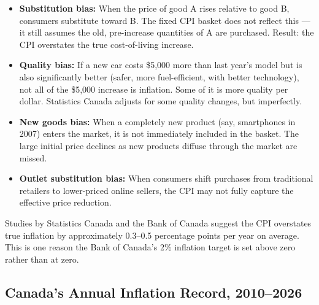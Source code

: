 \begin{itemize}
  \item \textbf{Substitution bias:} When the price of good A rises relative
        to good B, consumers substitute toward B. The fixed CPI basket
        does not reflect this --- it still assumes the old, pre-increase
        quantities of A are purchased. Result: the CPI overstates the
        true cost-of-living increase.

  \item \textbf{Quality bias:} If a new car costs \$5{,}000 more than last
        year's model but is also significantly better (safer, more
        fuel-efficient, with better technology), not all of the \$5{,}000
        increase is inflation. Some of it is more quality per dollar.
        Statistics Canada adjusts for some quality changes, but imperfectly.

  \item \textbf{New goods bias:} When a completely new product (say,
        smartphones in 2007) enters the market, it is not immediately
        included in the basket. The large initial price declines as new
        products diffuse through the market are missed.

  \item \textbf{Outlet substitution bias:} When consumers shift purchases
        from traditional retailers to lower-priced online sellers, the
        CPI may not fully capture the effective price reduction.
\end{itemize}

Studies by Statistics Canada and the Bank of Canada suggest the CPI
overstates true inflation by approximately 0.3--0.5 percentage points
per year on average. This is one reason the Bank of Canada's 2\% inflation
target is set above zero rather than at zero.

\subsection{Canada's Annual Inflation Record, 2010--2026}

